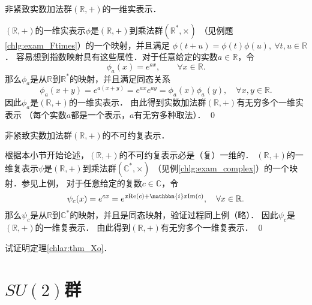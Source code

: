  
\begin{example}
	非紧致实数加法群$(\mathbb{R},+)$的一维实表示．
\end{example}
$(\mathbb{R},+)$的一维实表示$\phi$是$(\mathbb{R},+)$到乘法群$(\mathbb{R}^*,\times)$
（见例题\ref{chlg:exam_Ftimes}）的一个映射，并且满足
$\phi(t+u) = \phi(t)\phi(u),\ \forall t,u \in \mathbb{R}$．
容易想到指数映射具有这些属性．对于任意给定的实数$a\in \mathbb{R}$，令
\begin{equation*}
	\phi_a(x) = e^{a x},\qquad \forall x\in \mathbb{R}.
\end{equation*}
那么$\phi_a$是从$\mathbb{R}$到$\mathbb{R}^*$的映射，并且满足同态关系
\begin{equation*}
	\phi_a(x+y) = e^{a (x+y)}= e^{a x} e^{a y}=\phi_a(x)\phi_a(y),\quad \forall x,y\in \mathbb{R}.
\end{equation*}
因此$\phi_a$是$(\mathbb{R},+)$的一维实表示．
由此得到实数加法群$(\mathbb{R},+)$有无穷多个一维实表示
（每个实数$a$都是一个表示，$a$有无穷多种取法）．
\qed

\begin{example}\label{chlar:exam_R+C}
	非紧致实数加法群$(\mathbb{R},+)$的不可约复表示．
\end{example}
根据本小节开始论述，$(\mathbb{R},+)$的不可约复表示必是（复）一维的．
$(\mathbb{R},+)$的一维复表示$\psi$是$(\mathbb{R},+)$到乘法群$(\mathbb{C}^*,\times)$
（见例\ref{chlg:exam_complex}）的一个映射．参见上例，
对于任意给定的复数$c\in \mathbb{C}$，令
\begin{equation*}
	\psi_c(x) = e^{c x}=e^{x {\rm Re}(c)+ \mathbbm{i} x {\rm Im}(c) },
	\quad \forall x\in \mathbb{R}.
\end{equation*}
那么$\psi_c$是从$\mathbb{R}$到$\mathbb{C}^*$的映射，并且是同态映射，验证过程同上例（略）．
因此$\psi_c$是$(\mathbb{R},+)$的一维复表示．
由此得到$(\mathbb{R},+)$有无穷多个一维复表示．
\qed



\begin{exercise}
	试证明定理\ref{chlar:thm_Xo}．
\end{exercise}



\section{$SU(2)$群}\label{chlar:sec_SU2SO3}


